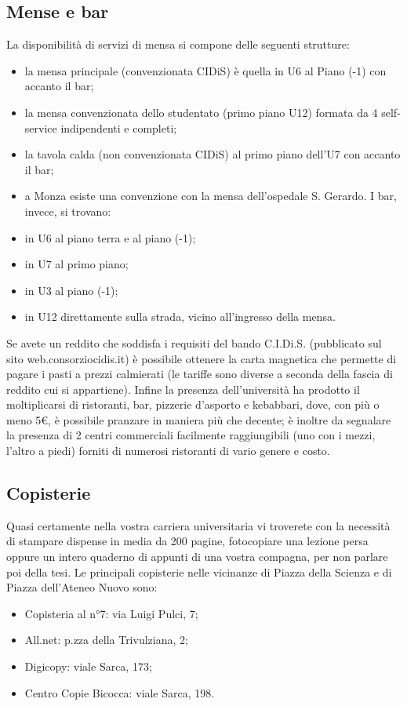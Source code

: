\subsection{Mense e bar}
La disponibilità di servizi di mensa si compone delle seguenti strutture:
\begin{itemize}
\item la mensa principale (convenzionata CIDiS) è quella in U6 al Piano (-1) con accanto il bar;
\item la mensa convenzionata dello studentato (primo piano U12) formata da 4 self-service indipendenti e completi;
\item la tavola calda (non convenzionata CIDiS) al primo piano dell'U7 con accanto il bar;
\item a Monza esiste una convenzione con la mensa dell'ospedale S. Gerardo.
I bar, invece, si trovano:
\item in U6 al piano terra e al piano (-1);
\item in U7 al primo piano;
\item in U3 al piano (-1);
\item in U12 direttamente sulla strada, vicino all'ingresso della mensa.
\end{itemize}
Se avete un reddito che soddisfa i requisiti del bando C.I.Di.S. (pubblicato sul sito web.consorziocidis.it) è possibile ottenere la carta magnetica che permette di pagare i pasti a prezzi calmierati (le tariffe sono diverse a seconda della fascia di reddito cui si appartiene).
Infine la presenza dell'università ha prodotto il moltiplicarsi di ristoranti, bar, pizzerie d'asporto e kebabbari, dove, con più o meno 5€, è possibile pranzare in maniera più che decente; è inoltre da segnalare la presenza di 2 centri commerciali facilmente raggiungibili (uno con i mezzi, l'altro a piedi) forniti di numerosi ristoranti di vario genere e costo.

\subsection{Copisterie}
Quasi certamente nella vostra carriera universitaria vi troverete con la necessità di stampare dispense in media da 200 pagine, fotocopiare una lezione persa oppure un intero quaderno di appunti di una vostra compagna, per non parlare poi della tesi. Le principali copisterie nelle vicinanze di Piazza della Scienza e di Piazza dell'Ateneo Nuovo sono:
\begin{itemize}
\item Copisteria al n°7: via Luigi Pulci, 7;
\item All.net: p.zza della Trivulziana, 2;
\item Digicopy: viale Sarca, 173;
\item Centro Copie Bicocca: viale Sarca, 198.
\end{itemize}
